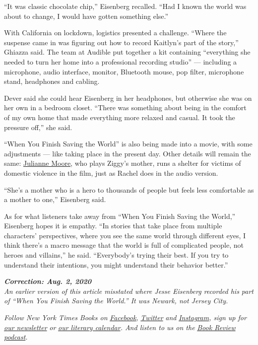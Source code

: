 ``It was classic chocolate chip,'' Eisenberg recalled. ``Had I known the
world was about to change, I would have gotten something else.''

With California on lockdown, logistics presented a challenge. ``Where
the suspense came in was figuring out how to record Kaitlyn's part of
the story,'' Ghiazza said. The team at Audible put together a kit
containing ``everything she needed to turn her home into a professional
recording studio'' --- including a microphone, audio interface, monitor,
Bluetooth mouse, pop filter, microphone stand, headphones and cabling.

Dever said she could hear Eisenberg in her headphones, but otherwise she
was on her own in a bedroom closet. ``There was something about being in
the comfort of my own home that made everything more relaxed and casual.
It took the pressure off,'' she said.

``When You Finish Saving the World'' is also being made into a movie,
with some adjustments --- like taking place in the present day. Other
details will remain the same:
\href{https://www.nytimes.com/2019/03/06/movies/julianne-moore-gloria-bell.html}{Julianne
Moore}, who plays Ziggy's mother, runs a shelter for victims of domestic
violence in the film, just as Rachel does in the audio version.

``She's a mother who is a hero to thousands of people but feels less
comfortable as a mother to one,'' Eisenberg said.

As for what listeners take away from ``When You Finish Saving the
World,'' Eisenberg hopes it is empathy. ``In stories that take place
from multiple characters' perspectives, where you see the same world
through different eyes, I think there's a macro message that the world
is full of complicated people, not heroes and villains,'' he said.
``Everybody's trying their best. If you try to understand their
intentions, you might understand their behavior better.''

\emph{\textbf{Correction: Aug. 2, 2020}}\\
\emph{An earlier version of this article misstated where Jesse Eisenberg
recorded his part of ``When You Finish Saving the World.'' It was
Newark, not Jersey City.}

\emph{Follow New York Times Books on}
\href{https://www.facebook.com/nytbooks/}{\emph{Facebook}}\emph{,}
\href{https://twitter.com/nytimesbooks}{\emph{Twitter}} \emph{and}
\href{https://www.instagram.com/nytbooks/}{\emph{Instagram}}\emph{, sign
up for}
\href{https://www.nytimes.com/newsletters/books-review}{\emph{our
newsletter}} \emph{or}
\href{https://www.nytimes.com/interactive/2017/books/books-calendar.html}{\emph{our
literary calendar}}\emph{. And listen to us on the}
\href{https://www.nytimes.com/column/book-review-podcast}{\emph{Book
Review podcast}}\emph{.}

